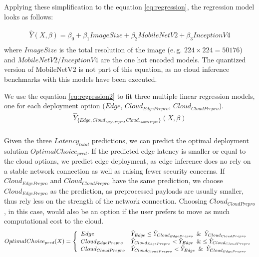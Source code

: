 Applying these simplification to the equation \ref{eq:regression}, the regression model looks as follows:

\begin{equation}\label{eq:regression2}
\begin{gathered}
\hat{Y}(X,\beta) = \beta_0 + \beta_1 ImageSize + \beta_2 MobileNetV2 + \beta_3 InceptionV4 \\
\end{gathered}
\end{equation}
where $ImageSize$ is the total resolution of the image (e.\,g. $224\times224=50176$) and $MobileNetV2/InceptionV4$ are the one hot encoded models. The quantized version of MobileNetV2 is not part of this equation, as no cloud inference benchmarks with this models have been executed.


We use the equation \ref{eq:regression2} to fit three multiple linear regression models, one for each deployment option ($Edge$, $Cloud_{EdgePrepro}$, $Cloud_{Cloud Prepro}$).
\begin{equation*}
\begin{gathered}
\hat{Y}_{\{Edge, Cloud_{EdgePrepro}, Cloud_{CloudPrepro}\}}(X,\beta) \\
\end{gathered}
\end{equation*}

Given the three $Latency_{total}$ predictions, we can predict the optimal deployment solution $OptimalChoice_{pred}$.
If the predicted edge latency is smaller or equal to the cloud options, we predict edge deployment, as edge inference does no rely on a stable network connection as well as raising fewer security concerns.
If $Cloud_{EdgePrepro}$ and $Cloud_{CloudPrepro}$ have the same prediction, we choose $Cloud_{EdgePrepro}$ as the prediction, as preprocessed payloads are usually smaller, thus rely less on the strength of the network connection. Choosing $Cloud_{CloudPrepro}$, in this case, would also be an option if the user prefers to move as much computational cost to the cloud.
\begin{equation*}
\begin{gathered}
OptimalChoice_{pred}(X) = \left\{\begin{array}{ll}
Edge  & \hat{Y}_{Edge} \leq \hat{Y}_{Cloud_{EdgePrepro}} \And \hat{Y}_{Cloud_{CloudPrepro}}\\
Cloud_{EdgePrepro}  &\hat{Y}_{Cloud_{EdgePrepro}} <   \hat{Y}_{Edge} \And \leq \hat{Y}_{Cloud_{CloudPrepro}}\\
Cloud_{CloudPrepro} & \hat{Y}_{Cloud_{CloudPrepro}} < \hat{Y}_{Edge} \And \hat{Y}_{Cloud_{EdgePrepro}}
\end{array}\right.
\end{gathered}
\end{equation*}

